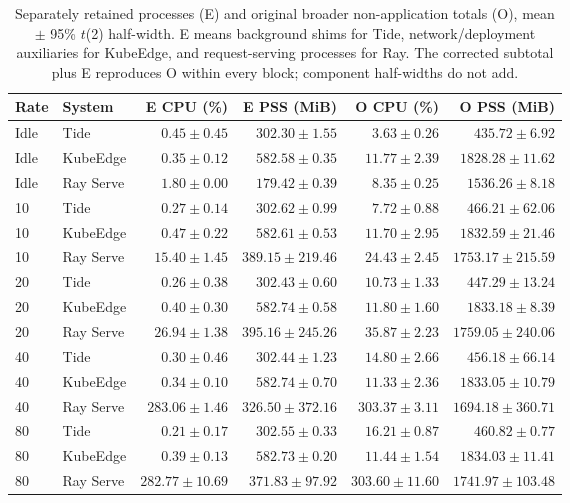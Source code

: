 \begin{table}[htbp]\centering\small
\caption{Separately retained processes (E) and original broader non-application totals (O), mean $\pm$ 95\% $t$(2) half-width. E means background shims for Tide, network/deployment auxiliaries for KubeEdge, and request-serving processes for Ray. The corrected subtotal plus E reproduces O within every block; component half-widths do not add.}
\label{tab:fig14-role-reconciliation}
\setlength{\tabcolsep}{3pt}
\begin{tabular*}{\linewidth}{@{\extracolsep{\fill}}llrrrr}
\toprule Rate & System & E CPU (\%) & E PSS (MiB) & O CPU (\%) & O PSS (MiB)\\\midrule
Idle & Tide & $0.45 \pm 0.45$ & $302.30 \pm 1.55$ & $3.63 \pm 0.26$ & $435.72 \pm 6.92$\\
Idle & KubeEdge & $0.35 \pm 0.12$ & $582.58 \pm 0.35$ & $11.77 \pm 2.39$ & $1828.28 \pm 11.62$\\
Idle & Ray Serve & $1.80 \pm 0.00$ & $179.42 \pm 0.39$ & $8.35 \pm 0.25$ & $1536.26 \pm 8.18$\\
10 & Tide & $0.27 \pm 0.14$ & $302.62 \pm 0.99$ & $7.72 \pm 0.88$ & $466.21 \pm 62.06$\\
10 & KubeEdge & $0.47 \pm 0.22$ & $582.61 \pm 0.53$ & $11.70 \pm 2.95$ & $1832.59 \pm 21.46$\\
10 & Ray Serve & $15.40 \pm 1.45$ & $389.15 \pm 219.46$ & $24.43 \pm 2.45$ & $1753.17 \pm 215.59$\\
20 & Tide & $0.26 \pm 0.38$ & $302.43 \pm 0.60$ & $10.73 \pm 1.33$ & $447.29 \pm 13.24$\\
20 & KubeEdge & $0.40 \pm 0.30$ & $582.74 \pm 0.58$ & $11.80 \pm 1.60$ & $1833.18 \pm 8.39$\\
20 & Ray Serve & $26.94 \pm 1.38$ & $395.16 \pm 245.26$ & $35.87 \pm 2.23$ & $1759.05 \pm 240.06$\\
40 & Tide & $0.30 \pm 0.46$ & $302.44 \pm 1.23$ & $14.80 \pm 2.66$ & $456.18 \pm 66.14$\\
40 & KubeEdge & $0.34 \pm 0.10$ & $582.74 \pm 0.70$ & $11.33 \pm 2.36$ & $1833.05 \pm 10.79$\\
40 & Ray Serve & $283.06 \pm 1.46$ & $326.50 \pm 372.16$ & $303.37 \pm 3.11$ & $1694.18 \pm 360.71$\\
80 & Tide & $0.21 \pm 0.17$ & $302.55 \pm 0.33$ & $16.21 \pm 0.87$ & $460.82 \pm 0.77$\\
80 & KubeEdge & $0.39 \pm 0.13$ & $582.73 \pm 0.20$ & $11.44 \pm 1.54$ & $1834.03 \pm 11.41$\\
80 & Ray Serve & $282.77 \pm 10.69$ & $371.83 \pm 97.92$ & $303.60 \pm 11.60$ & $1741.97 \pm 103.48$\\
\bottomrule\end{tabular*}\end{table}

